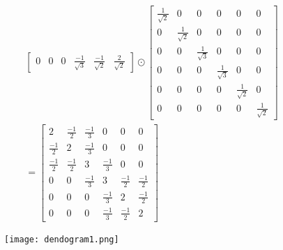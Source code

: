 \documentclass{article}
\begin{document}
\begin{multline*}
\begin{bmatrix}
      0                   & 0                   & 0                   & \frac{-1}{\sqrt{3}} & \frac{-1}{\sqrt{2}} & \frac{2}{\sqrt{2}}
    \end{bmatrix}
    \odot \begin{bmatrix}
      \frac{1}{\sqrt{2}} & 0 & 0 & 0 & 0 & 0 \\
      0 & \frac{1}{\sqrt{2}} & 0 & 0 & 0 & 0 \\
      0 & 0 & \frac{1}{\sqrt{3}} & 0 & 0 & 0 \\
      0 & 0 & 0 & \frac{1}{\sqrt{3}} & 0 & 0 \\
      0 & 0 & 0 & 0 & \frac{1}{\sqrt{2}} & 0 \\
      0 & 0 & 0 & 0 & 0 & \frac{1}{\sqrt{2}}
    \end{bmatrix} \\
    = \begin{bmatrix}
      2            & \frac{-1}{2} & \frac{-1}{3} & 0 & 0 & 0 \\
      \frac{-1}{2} & 2            & \frac{-1}{3} & 0 & 0 & 0 \\
      \frac{-1}{2} & \frac{-1}{2} & 3            & \frac{-1}{3} & 0 & 0 \\
      0            & 0            & \frac{-1}{3} & 3            & \frac{-1}{2} & \frac{-1}{2} \\
      0            & 0            & 0            & \frac{-1}{3} & 2            & \frac{-1}{2} \\
      0            & 0            & 0            & \frac{-1}{3} & \frac{-1}{2} & 2
    \end{bmatrix}
\end{multline*}

\newpage



\begin{figure}[h!]
  \texttt{[image: dendogram1.png]}
\end{figure}
\end{document}
